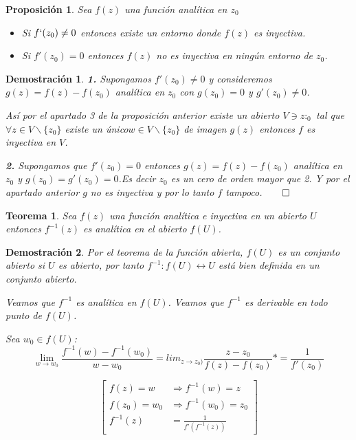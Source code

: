 \documentclass[12pt]{book}
\newtheorem{theorem}{Teorema}[chapter]
\newtheorem{prop}{Proposición}[chapter]
\newtheorem*{dem}{Demostración}
\begin{document}
\begin{prop}
Sea $f(z)$ una función analítica en $z_0$
\begin{itemize}
\item Si $f`(z_0) \neq 0$ entonces existe un entorno donde $f(z)$ es inyectiva.
\item Si $f'(z_0)=0$ entonces $f(z)$ no es inyectiva en ningún entorno de $z_0$.
\end{itemize}
\end{prop}

\begin{dem}
\textbf{1.} Supongamos $f'(z_0)\neq 0$ y consideremos $g(z) = f(z)-f(z_0)$ analítica en $z_0$ con  $g(z_0) = 0$ y $g'(z_0) \neq 0$.

Así por el apartado 3 de la proposición anterior existe un abierto $V\ni z:_0$ tal que $\forall z\in V\backslash\{z_0\}$ existe un único$w \in V\backslash\{z_0\}$ de imagen $g(z)$ entonces $f$ es inyectiva en $V$.

\textbf{2.} Supongamos que $f'(z_0)=0$ entonces $g(z) = f(z)-f(z_0)$ analítica en $z_0$ y $g(z_0)= g'(z_0) = 0$.Es decir $z_0$ es un cero de orden mayor que 2. Y por el apartado anterior $g$ no es inyectiva y por lo tanto $f$ tampoco.$\qed$

\end{dem}


\begin{theorem}
Sea $f(z)$ una función analítica e inyectiva en un abierto $U$ entonces $f^{-1}(z)$ es analítica en el abierto $f(U)$.
\end{theorem}

\begin{dem}
Por el teorema de la función abierta, $f(U)$ es un conjunto abierto si $U$ es abierto, por tanto $f^{-1}: f(U)\longleftrightarrow U$ está bien definida en un conjunto abierto.

Veamos que $f^{-1}$ es analítica en $f(U)$. Veamos que $f^{-1}$ es derivable en todo punto de $f(U)$.

Sea $w_0\in f(U)$:
$$
\lim_{w\to w_0}\frac{f^{-1}(w) - f^{-1}(w_0)}{w-w_0} = lim_{z\to z_0)} \frac{z-z_0}{f(z)-f(z_0)} *= \frac{1}{f'(z_0)}
$$

$$\left[\begin{array}{ll}
f(z) = w &\Rightarrow f^{-1}(w) = z\\
 f(z_0) = w_0 &\Rightarrow f^{-1}(w_0) = z_0\\
 f^{-1}(z) &= \frac{1}{f'(f^{-1}(z))}
\end{array}\right]$$
\end{dem}
\end{document}

